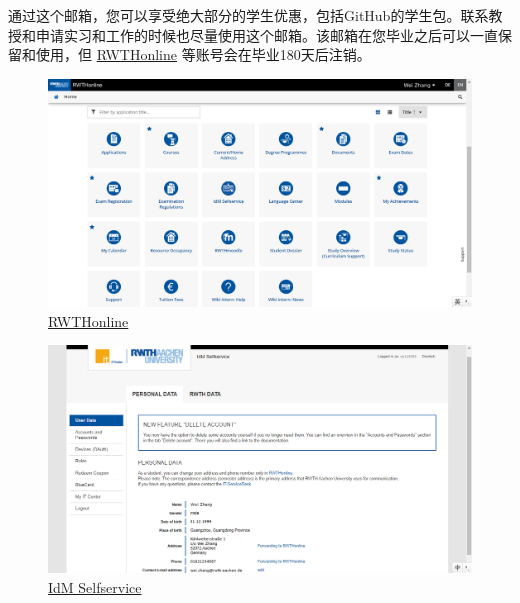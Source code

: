     通过这个邮箱，您可以享受绝大部分的学生优惠，包括GitHub的学生包。联系教授和申请实习和工作的时候也尽量使用这个邮箱。该邮箱在您毕业之后可以一直保留和使用，但 \href{https://online.rwth-aachen.de/}{RWTHonline} 等账号会在毕业180天后注销。

    \begin{figure}[H]
      \centering
      \includegraphics[width=\textwidth]{初来乍到/Management_System/RWTHonline.png}
      \caption{\href{https://online.rwth-aachen.de/}{RWTHonline}}
      \label{fig:RWTHonline}
    \end{figure}

    \begin{figure}[H]
      \centering
      \includegraphics[width=\textwidth]{初来乍到/Management_System/idm.png}
      \caption{\href{https://idm.rwth-aachen.de/selfservice}{IdM Selfservice}}
      \label{fig:IdM Selfservice}
    \end{figure}

